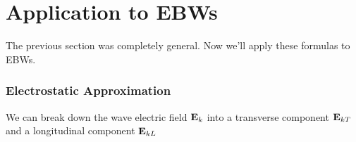 \documentclass[12pt, twoside]{article}
\numberwithin{equation}{subsection}
\begin{document}
	
	
	
	
	
	
	\section{Application to EBWs}
	The previous section was completely general. Now we'll apply these formulas to EBWs.
	
	\subsubsection{Electrostatic Approximation}
	We can break down the wave electric field $\textbf{E}_k$ into a transverse component $\textbf{E}_{kT}$ and a longitudinal component $\textbf{E}_{kL}$
	
	
	
	\printbibliography
\end{document}
